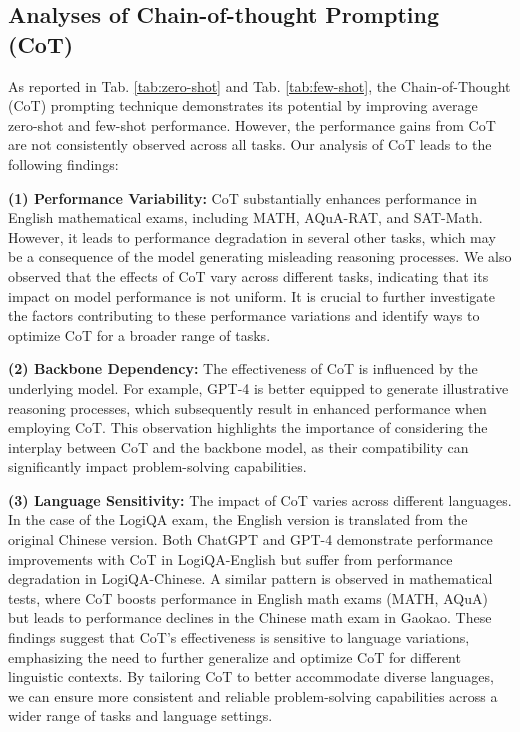 \subsection{Analyses of Chain-of-thought Prompting (CoT)}
\label{sec:cot-analysis}
As reported in Tab. \ref{tab:zero-shot} and Tab. \ref{tab:few-shot}, the Chain-of-Thought (CoT) prompting technique demonstrates its potential by improving average zero-shot and few-shot performance. However, the performance gains from CoT are not consistently observed across all tasks. Our analysis of CoT leads to the following findings:
\par
\textbf{(1) Performance Variability:} CoT substantially enhances performance in English mathematical exams, including MATH, AQuA-RAT, and SAT-Math. However, it leads to performance degradation in several other tasks, which may be a consequence of the model generating misleading reasoning processes. We also observed that the effects of CoT vary across different tasks, indicating that its impact on model performance is not uniform. It is crucial to further investigate the factors contributing to these performance variations and identify ways to optimize CoT for a broader range of tasks. 
\par
\textbf{(2) Backbone Dependency:} The effectiveness of CoT is influenced by the underlying model. For example, GPT-4 is better equipped to generate illustrative reasoning processes, which subsequently result in enhanced performance when employing CoT. This observation highlights the importance of considering the interplay between CoT and the backbone model, as their compatibility can significantly impact problem-solving capabilities.
\par
\textbf{(3) Language Sensitivity:} The impact of CoT varies across different languages. In the case of the LogiQA exam, the English version is translated from the original Chinese version. Both ChatGPT and GPT-4 demonstrate performance improvements with CoT in LogiQA-English but suffer from performance degradation in LogiQA-Chinese. A similar pattern is observed in mathematical tests, where CoT boosts performance in English math exams (MATH, AQuA) but leads to performance declines in the Chinese math exam in Gaokao. These findings suggest that CoT's effectiveness is sensitive to language variations, emphasizing the need to further generalize and optimize CoT for different linguistic contexts. By tailoring CoT to better accommodate diverse languages, we can ensure more consistent and reliable problem-solving capabilities across a wider range of tasks and language settings.

